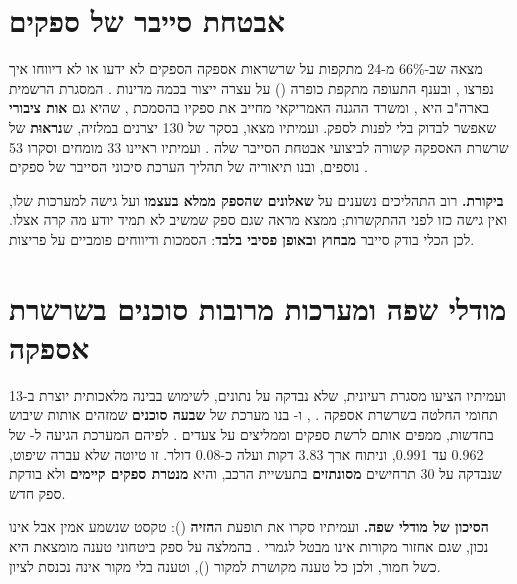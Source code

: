 \section{אבטחת סייבר של ספקים}\label{sec:lit-cyber}

 מצאה שב-66\% מ-24 מתקפות על שרשראות אספקה הספקים לא ידעו או לא דיווחו איך נפרצו \cite{enisa2021}, ובענף התעופה מתקפת כופרה () על  עצרה ייצור בכמה מדינות \cite{certeu2019}. המסגרת הרשמית בארה"ב היא  \cite{nist2022}, ומשרד ההגנה האמריקאי מחייב את ספקיו בהסמכת  \cite{cmmc2024}, שהיא גם \textbf{אות ציבורי} שאפשר לבדוק בלי לפנות לספק.  ועמיתיו מצאו, בסקר של 130 יצרנים במלזיה, ש\textbf{נראוּת} של שרשרת האספקה קשורה לביצועי אבטחת הסייבר שלה \cite{gani2023}.  ועמיתיו ראיינו 33 מומחים וסקרו 53 נוספים, ובנו תיאוריה של תהליך הערכת סיכוני הסייבר של ספקים \cite{slapnicar2025}.

\textbf{ביקורת.} רוב התהליכים נשענים על \textbf{שאלונים שהספק ממלא בעצמו} ועל גישה למערכות שלו, ואין גישה כזו לפני ההתקשרות; ממצא  מראה שגם ספק שמשיב לא תמיד יודע מה קרה אצלו. לכן הכלי בודק סייבר \textbf{מבחוץ ובאופן פסיבי בלבד}: הסמכות ודיווחים פומביים על פריצות.

\section{מודלי שפה ומערכות מרובות סוכנים בשרשרת אספקה}\label{sec:lit-agents}

 ועמיתיו הציעו מסגרת רעיונית, שלא נבדקה על נתונים, לשימוש בבינה מלאכותית יוצרת ב-13 תחומי החלטה בשרשרת אספקה \cite{jackson2024}. ,  ו- בנו מערכת של \textbf{שבעה סוכנים} שמזהים אותות שיבוש בחדשות, ממפים אותם לרשת ספקים וממליצים על צעדים \cite{almahri2026}. לפיהם המערכת הגיעה ל- של 0.962 עד 0.991, וניתוח ארך 3.83 דקות ועלה כ-0.08 דולר. זו טיוטה שלא עברה שיפוט, שנבדקה על 30 תרחישים \textbf{מסונתזים} בתעשיית הרכב, והיא \textbf{מנטרת ספקים קיימים} ולא בודקת ספק חדש.

\textbf{הסיכון של מודלי שפה.}  ועמיתיו סקרו את תופעת ה\textbf{הזיה} (): טקסט שנשמע אמין אבל אינו נכון, שגם אחזור מקורות אינו מבטל לגמרי \cite{huang2025}. בהמלצה על ספק ביטחוני טענה מומצאת היא כשל חמור, ולכן כל טענה מקושרת למקור (), וטענה בלי מקור אינה נכנסת לציון.


